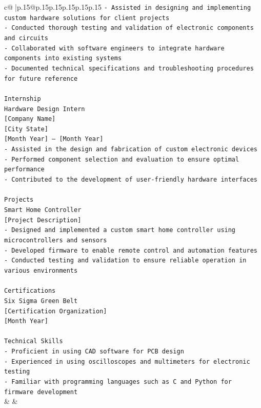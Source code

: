 \documentclass{article}
\begin{document}
{\begin{supertabular}{c@{$\;$}|p{.15\linewidth}@{}p{.15\linewidth}p{.15\linewidth}p{.15\linewidth}p{.15\linewidth}p{.15\linewidth}}
{{{\texttt{{-} Assisted in designing and implementing custom hardware solutions for client projects} \\
\texttt{{-} Conducted thorough testing and validation of electronic components and circuits} \\
\texttt{{-} Collaborated with software engineers to integrate hardware components into existing systems} \\
\texttt{{-} Documented technical specifications and troubleshooting procedures for future reference} \\
\\ 
\texttt{Internship} \\
\texttt{Hardware Design Intern} \\
\texttt{{[}Company Name{]}} \\
\texttt{{[}City State{]}} \\
\texttt{{[}Month Year{]} – {[}Month Year{]}} \\
\texttt{{-} Assisted in the design and fabrication of custom electronic devices} \\
\texttt{{-} Performed component selection and evaluation to ensure optimal performance} \\
\texttt{{-} Contributed to the development of user{-}friendly hardware interfaces} \\
\\ 
\texttt{Projects} \\
\texttt{Smart Home Controller} \\
\texttt{{[}Project Description{]}} \\
\texttt{{-} Designed and implemented a custom smart home controller using microcontrollers and sensors} \\
\texttt{{-} Developed firmware to enable remote control and automation features} \\
\texttt{{-} Conducted testing and validation to ensure reliable operation in various environments} \\
\\ 
\texttt{Certifications} \\
\texttt{Six Sigma Green Belt} \\
\texttt{{[}Certification Organization{]}} \\
\texttt{{[}Month Year{]}} \\
\\ 
\texttt{Technical Skills} \\
\texttt{{-} Proficient in using CAD software for PCB design} \\
\texttt{{-} Experienced in using oscilloscopes and multimeters for electronic testing} \\
\texttt{{-} Familiar with programming languages such as C and Python for firmware development} \\
            }
        }
    }
    & & \\ \\


\end{supertabular}}
\end{document}
